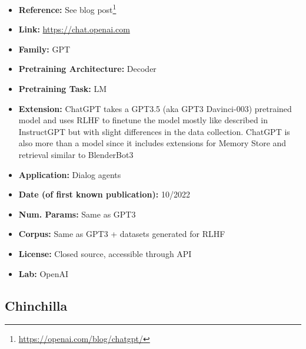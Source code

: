 \documentclass{article}
\begin{document}
            \begin{itemize}
                \item \textbf{Reference:} See blog post\footnote{\url{https://openai.com/blog/chatgpt/}}
                \item \textbf{Link:} \url{https://chat.openai.com}
                \item \textbf{Family:} GPT 
                \item \textbf{Pretraining Architecture:} Decoder
                \item \textbf{Pretraining Task:} LM
                \item \textbf{Extension:} ChatGPT takes a GPT3.5 (aka GPT3 Davinci-003) pretrained model and uses RLHF to finetune the model mostly like described in InstructGPT but with slight differences in the data collection. ChatGPT is also more than a model since it includes extensions for Memory Store and retrieval similar to BlenderBot3  
                \item \textbf{Application:} Dialog agents
                \item \textbf{Date (of first known publication):} 10/2022
                \item \textbf{Num. Params:} Same as GPT3
                \item \textbf{Corpus:} Same as GPT3 + datasets generated for RLHF
                \item \textbf{License:} Closed source, accessible through API
                \item \textbf{Lab:} OpenAI
            \end{itemize}

\subsection{Chinchilla}
\end{document}
